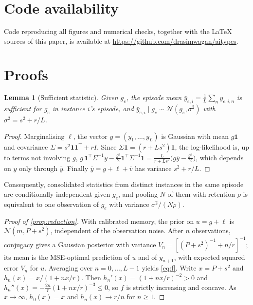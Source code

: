\documentclass[11pt]{article}
\theoremstyle{plain}
\newtheorem{lemma}{Lemma}
\theoremstyle{definition}
\theoremstyle{remark}
\begin{document}
\section*{Code availability}
Code reproducing all figures and numerical checks, together with the \LaTeX{} sources of this paper, is available at \url{https://github.com/drasimwagan/aitypes}.




\appendix
\section{Proofs}
\label{app:proofs}

\begin{lemma}[Sufficient statistic]
\label{lem:suff}
Given $g_e$, the episode mean $\bar y_{e,i}=\frac1L\sum_n y_{e,i,n}$ is sufficient for $g_e$ in instance $i$'s episode, and $\bar y_{e,i}\mid g_e\sim\mathcal{N}(g_e,\sigma^2)$ with $\sigma^2=s^2+r/L$.
\end{lemma}
\begin{proof}
Marginalising $\ell$, the vector $y=(y_1,\dots,y_L)$ is Gaussian with mean $g\mathbf{1}$ and covariance $\Sigma=s^2\mathbf{1}\mathbf{1}^\top+rI$. Since $\Sigma\mathbf{1}=(r+Ls^2)\mathbf{1}$, the log-likelihood is, up to terms not involving $g$, $g\,\mathbf{1}^\top\Sigma^{-1}y-\tfrac{g^2}{2}\mathbf{1}^\top\Sigma^{-1}\mathbf{1}=\frac{L}{r+Ls^2}\big(g\bar y-\tfrac{g^2}{2}\big)$, which depends on $y$ only through $\bar y$. Finally $\bar y=g+\ell+\bar v$ has variance $s^2+r/L$.
\end{proof}

Consequently, consolidated statistics from distinct instances in the same episode are conditionally independent given $g_e$, and pooling $N$ of them with retention $\rho$ is equivalent to one observation of $g_e$ with variance $\sigma^2/(N\rho)$.

\begin{proof}[Proof of \cref{prop:reduction}]
With calibrated memory, the prior on $u=g+\ell$ is $\mathcal{N}(m,P+s^2)$, independent of the observation noise. After $n$ observations, conjugacy gives a Gaussian posterior with variance $V_n=[(P+s^2)^{-1}+n/r]^{-1}$; its mean is the MSE-optimal prediction of $u$ and of $y_{n+1}$, with expected squared error $V_n$ for $u$. Averaging over $n=0,\dots,L-1$ yields \eqref{eq:f}. Write $x=P+s^2$ and $h_n(x)=x/(1+nx/r)$. Then $h_n'(x)=(1+nx/r)^{-2}>0$ and $h_n''(x)=-\tfrac{2n}{r}(1+nx/r)^{-3}\le0$, so $f$ is strictly increasing and concave. As $x\to\infty$, $h_0(x)=x$ and $h_n(x)\to r/n$ for $n\ge1$.
\end{proof}
\end{document}
